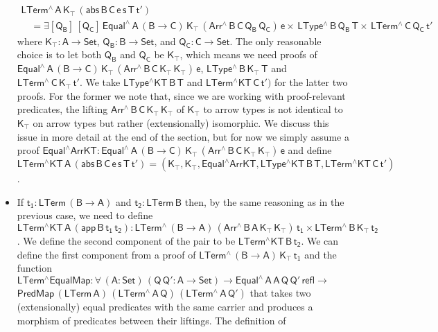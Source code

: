 \documentclass[9pt]{entcs}
\begin{document}
\begin{itemize}
  \[\begin{array}{l}
  \mathsf{LTerm^{\wedge}\,A\,K_\top\, (abs \,B \,C \,e \,s \,T
  \,t')}\\
\quad \mathsf{ = \exists [Q_B]\, [Q_C]\, Equal^{\wedge} \, A\, (B \to
    C)\, K_\top\, (Arr^{\wedge} \, B\, C\, Q_B \, Q_C)\, e \times \,
    LType^{\wedge}\, B\, Q_B\, T \times \, LTerm^{\wedge}\, C\, Q_C\,
    t' }
\end{array}\]
where $\mathsf{K_\top : A \to Set}$, $\mathsf{Q_B : B \to Set}$, and
$\mathsf{Q_C : C \to Set}$.  The only reasonable choice is to let both
$\mathsf{Q_B}$ and $\mathsf{Q_C}$ be $\mathsf{K_\top}$, which means we
need proofs of $\mathsf{Equal^{\wedge} \, A\, (B \to C)\, K_\top\,
  (Arr^{\wedge} \, B\, C\, K_\top \, K_\top)\, e}$,
$\mathsf{LType^{\wedge}\, B\, K_\top\, T}$ and
$\mathsf{LTerm^{\wedge}\, C\, K_\top\, t'}$.  We take
$\mathsf{LType^\wedge KT\, B\, T}$ and $\mathsf{LTerm^\wedge KT\, C\,
  t')}$ for the latter two proofs. For the former we note that, since
we are working with proof-relevant predicates, the lifting
$\mathsf{Arr^{\wedge} \, B\, C\, K_\top \, K_\top}$ of
$\mathsf{K_\top}$ to arrow types is not identical to $\mathsf{K_\top}$
on arrow types but rather (extensionally) isomorphic.  We discuss this
issue in more detail at the end of the section, but for now we simply
assume a proof $\mathsf{Equal^\wedge ArrKT : Equal^{\wedge} \, A\, (B
  \to C)\, K_\top\, (Arr^{\wedge} \, B\, C\, K_\top \, K_\top)\, e}$
and define $\mathsf{LTerm^\wedge KT\,A\, (abs\, B \,C \, e \,s \,T \,
  t') = (K_\top , K_\top , Equal^\wedge ArrKT , LType^\wedge KT\, B\,
  T , LTerm^\wedge KT\, C\, t') }$.
\item If $\mathsf{t_1 : LTerm\,(B \to A)}$ and $\mathsf{t_2 :
  LTerm\,B}$ then, by the same reasoning as in the previous case, we
  need to define $\mathsf{LTerm^\wedge KT\,A\, (app\, B \, t_1\,t_2)}
  : \mathsf{LTerm^{\wedge}\, (B \to A)\, (Arr^{\wedge} \, B\, A\,
    K_\top \, K_\top)\, t_1 \times LTerm^{\wedge}\, B\, K_\top\,
    t_2}$.  We define the second component of the pair to be
  $\mathsf{LTerm^\wedge KT\,B\,t_2}$. We can define the first
  component from a proof of $\mathsf{LTerm^{\wedge}\, (B \to A)\,
    K_\top\, t_1}$ and the function $\mathsf{LTerm^\wedge EqualMap :
    \forall\, (A : Set)\, (Q\,Q' : A \to Set) \to
    Equal^\wedge\,A\,A\,Q\,Q'\,refl \to}$
  $\mathsf{PredMap\,(LTerm\,A)\,
    (LTerm^{\wedge}\,A\,Q)\,(LTerm^{\wedge}\,A\,Q')}$ that takes two
  (extensionally) equal predicates with the same carrier and produces
  a morphism of predicates between their liftings. The definition of

\end{itemize}
\end{document}
